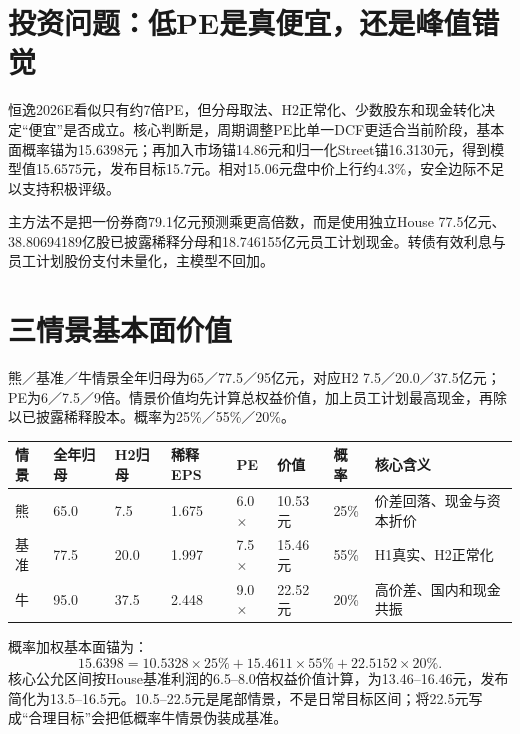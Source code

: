 \section{投资问题：低PE是真便宜，还是峰值错觉}

恒逸2026E看似只有约7倍PE，但分母取法、H2正常化、少数股东和现金转化决定“便宜”是否成立。核心判断是，周期调整PE比单一DCF更适合当前阶段，基本面概率锚为15.6398元；再加入市场锚14.86元和归一化Street锚16.3130元，得到模型值15.6575元，发布目标15.7元。相对15.06元盘中价上行约4.3\%，安全边际不足以支持积极评级。

主方法不是把一份券商79.1亿元预测乘更高倍数，而是使用独立House 77.5亿元、38.80694189亿股已披露稀释分母和18.746155亿元员工计划现金。转债有效利息与员工计划股份支付未量化，主模型不回加。

\section{三情景基本面价值}

熊／基准／牛情景全年归母为65／77.5／95亿元，对应H2 7.5／20.0／37.5亿元；PE为6／7.5／9倍。情景价值均先计算总权益价值，加上员工计划最高现金，再除以已披露稀释股本。概率为25\%／55\%／20\%。

\begin{exhibitbox}[三情景权益价值]
\noindent\begin{tabularx}{\textwidth}{L{1.8cm}R{1.8cm}R{1.8cm}R{1.8cm}R{1.4cm}R{1.7cm}R{1.3cm}X}
\toprule
\textbf{情景} & \textbf{全年归母} & \textbf{H2归母} & \textbf{稀释EPS} & \textbf{PE} & \textbf{价值} & \textbf{概率} & \textbf{核心含义} \\
\midrule
熊 & 65.0 & 7.5 & 1.675 & 6.0$\times$ & 10.53元 & 25\% & 价差回落、现金与资本折价 \\
基准 & 77.5 & 20.0 & 1.997 & 7.5$\times$ & 15.46元 & 55\% & H1真实、H2正常化 \\
牛 & 95.0 & 37.5 & 2.448 & 9.0$\times$ & 22.52元 & 20\% & 高价差、国内和现金共振 \\
\bottomrule
\end{tabularx}
\end{exhibitbox}

概率加权基本面锚为：
\[
15.6398=10.5328\times25\%+15.4611\times55\%+22.5152\times20\%.
\]
核心公允区间按House基准利润的6.5--8.0倍权益价值计算，为13.46--16.46元，发布简化为13.5--16.5元。10.5--22.5元是尾部情景，不是日常目标区间；将22.5元写成“合理目标”会把低概率牛情景伪装成基准。

